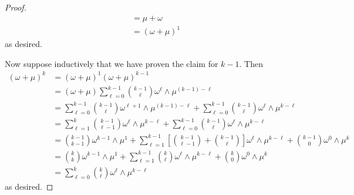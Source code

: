 \documentclass[../psets.tex]{subfiles}
\begin{document}
\begin{enumerate}[label={\textbf{1.6.\roman*.}}]
\begin{proof}
\begin{align*}
            &= \mu+\omega\\
            &= (\omega+\mu)^1
        \end{align*}
        as desired.\par
        Now suppose inductively that we have proven the claim for $k-1$. Then
        \begin{align*}
            (\omega+\mu)^k &= (\omega+\mu)^1(\omega+\mu)^{k-1}\\
            &= (\omega+\mu)\sum_{\ell=0}^{k-1}\binom{k-1}{\ell}\omega^\ell\wedge\mu^{(k-1)-\ell}\\
            &= \sum_{\ell=0}^{k-1}\binom{k-1}{\ell}\omega^{\ell+1}\wedge\mu^{(k-1)-\ell}+\sum_{\ell=0}^{k-1}\binom{k-1}{\ell}\omega^\ell\wedge\mu^{k-\ell}\\
            &= \sum_{\ell=1}^k\binom{k-1}{\ell-1}\omega^{\ell}\wedge\mu^{k-\ell}+\sum_{\ell=0}^{k-1}\binom{k-1}{\ell}\omega^\ell\wedge\mu^{k-\ell}\\
            &= \binom{k-1}{k-1}\omega^{k-1}\wedge\mu^1+\sum_{\ell=1}^{k-1}\left[ \binom{k-1}{\ell-1}+\binom{k-1}{\ell} \right]\omega^{\ell}\wedge\mu^{k-\ell}+\binom{k-1}{0}\omega^0\wedge\mu^k\\
            &= \binom{k}{k}\omega^{k-1}\wedge\mu^1+\sum_{\ell=1}^{k-1}\binom{k}{\ell}\omega^{\ell}\wedge\mu^{k-\ell}+\binom{k}{0}\omega^0\wedge\mu^k\\
            &= \sum_{\ell=0}^k\binom{k}{\ell}\omega^{\ell}\wedge\mu^{k-\ell}
        \end{align*}
        as desired.
    \end{proof}
\end{enumerate}
\end{document}
